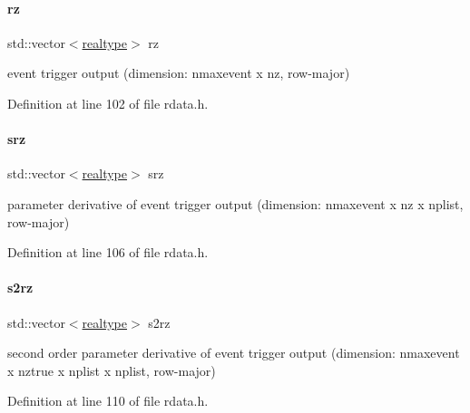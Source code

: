 \mbox{\label{classamici_1_1_return_data_a1f65c4ec9c07d353d79f54d4c96365ca}} 
\paragraph{\texorpdfstring{rz}{rz}}
{\footnotesize\ttfamily std\+::vector$<$\mbox{\hyperlink{namespaceamici_a1bdce28051d6a53868f7ccbf5f2c14a3}{realtype}}$>$ rz}

event trigger output (dimension\+: nmaxevent x nz, row-\/major) 

Definition at line 102 of file rdata.\+h.

\mbox{\label{classamici_1_1_return_data_ada7991b82464e52bcdc20c69175fe1e9}} 
\paragraph{\texorpdfstring{srz}{srz}}
{\footnotesize\ttfamily std\+::vector$<$\mbox{\hyperlink{namespaceamici_a1bdce28051d6a53868f7ccbf5f2c14a3}{realtype}}$>$ srz}

parameter derivative of event trigger output (dimension\+: nmaxevent x nz x nplist, row-\/major) 

Definition at line 106 of file rdata.\+h.

\mbox{\label{classamici_1_1_return_data_ade4be6e8e3e8cc9eb4642904e3e9ce56}} 
\paragraph{\texorpdfstring{s2rz}{s2rz}}
{\footnotesize\ttfamily std\+::vector$<$\mbox{\hyperlink{namespaceamici_a1bdce28051d6a53868f7ccbf5f2c14a3}{realtype}}$>$ s2rz}

second order parameter derivative of event trigger output (dimension\+: nmaxevent x nztrue x nplist x nplist, row-\/major) 

Definition at line 110 of file rdata.\+h.

